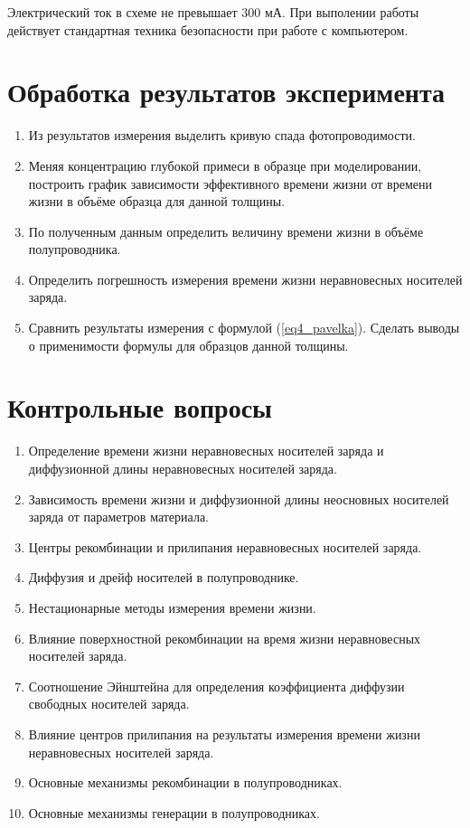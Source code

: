 Электрический ток в схеме не превышает 300 мА. При выполении работы действует стандартная техника безопасности при работе с компьютером.

\section{Обработка результатов эксперимента}

\begin{enumerate}
\item Из результатов измерения выделить кривую спада фотопроводимости.
\item Меняя концентрацию глубокой примеси в образце при моделировании, построить график зависимости эффективного времени жизни от времени жизни в объёме образца для данной толщины.
\item По полученным данным определить величину времени жизни в объёме полупроводника.
\item Определить погрешность измерения времени жизни неравновесных носителей заряда.
\item Сравнить результаты измерения с формулой (\ref{eq4_pavelka}). Сделать выводы о применимости формулы для образцов данной толщины.
\end{enumerate}

\section{Контрольные вопросы}

\begin{enumerate}
\item Определение времени жизни неравновесных носителей заряда и диффузионной длины неравновесных носителей заряда.
\item Зависимость времени жизни и диффузионной длины неосновных носителей заряда от параметров материала.
\item Центры рекомбинации и прилипания неравновесных носителей заряда.
\item Диффузия и дрейф носителей в полупроводнике.
\item Нестационарные методы измерения времени жизни.
\item Влияние поверхностной рекомбинации на время жизни неравновесных носителей заряда.
\item Соотношение Эйнштейна для определения коэффициента диффузии свободных носителей заряда.
\item Влияние центров прилипания на результаты измерения времени жизни неравновесных носителей заряда.
\item Основные механизмы рекомбинации в полупроводниках.
\item Основные механизмы генерации в полупроводниках.
\end{enumerate}

